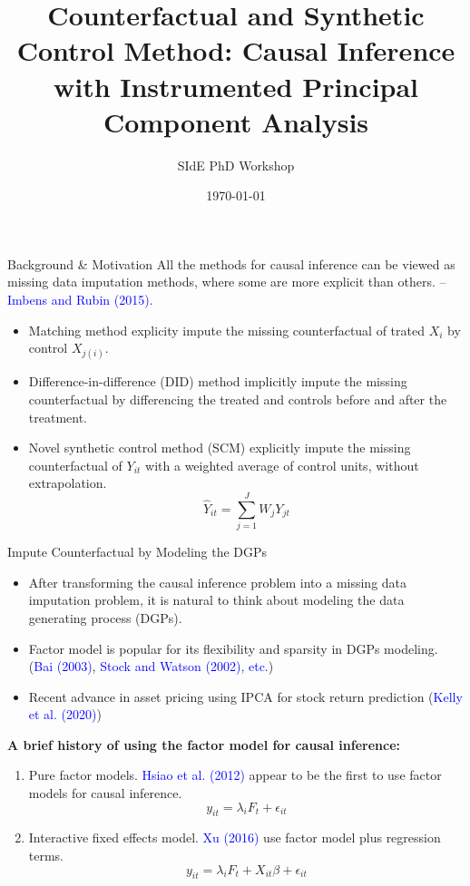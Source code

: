 \documentclass{beamer}
\title{Counterfactual and  Synthetic Control Method: Causal Inference with Instrumented Principal Component Analysis}
\author{SIdE PhD Workshop}
\institute{Sapienza University of Rome}
\date{\today}
\begin{document}
\begin{frame}
\titlepage
\end{frame}

\begin{frame}{Background \& Motivation}
All the methods for causal inference can be viewed as missing data imputation methods, where some are more explicit than others. -- \textcolor{blue}{Imbens and Rubin (2015)}.

\begin{itemize}
    \item Matching method explicity impute the missing counterfactual of trated $X_i$ by control $X_{j(i)}$.
    \item Difference-in-difference (DID) method implicitly impute the missing counterfactual by differencing the treated and controls before and after the treatment.
    \item Novel synthetic control method (SCM) explicitly impute the missing counterfactual of $Y_{it}$ with a weighted average of control units, without extrapolation.
    $$
    \hat{Y}_{it} = \sum_{j=1}^{J} W_{j} Y_{jt}
    $$
\end{itemize}

\end{frame}

\begin{frame}{Impute Counterfactual by Modeling the DGPs}
\begin{itemize}
    \item After transforming the causal inference problem into a missing data imputation problem, it is natural to think about modeling the data generating process (DGPs).
    \item Factor model is popular for its flexibility and sparsity in DGPs modeling. (\textcolor{blue}{Bai (2003)}, \textcolor{blue}{Stock and Watson (2002), etc.})
    \item Recent advance in asset pricing using IPCA for stock return prediction (\textcolor{blue}{Kelly et al. (2020)})
\end{itemize}

\textbf{A brief history of using the factor model for causal inference:}
\begin{enumerate}
    \item Pure factor models. \textcolor{blue}{Hsiao et al. (2012)} appear to be the first to use factor models for causal inference.
    $$y_{it} = \lambda_i F_t + \epsilon_{it}$$
    \item Interactive fixed effects model. \textcolor{blue}{Xu (2016)} use factor model plus regression terms.
    $$y_{it} = \lambda_{i} F_t + X_{it} \beta + \epsilon_{it}$$
\end{enumerate}
\end{frame}
\end{document}
